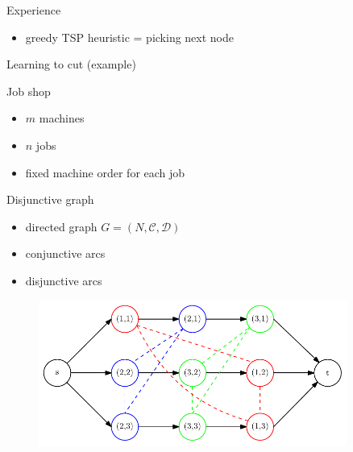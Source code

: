 \documentclass[bigger]{beamer}
\begin{document}
\begin{frame}[label={sec:org72eda48}]{Experience}
\begin{itemize}
\item greedy TSP heuristic = picking next node
\end{itemize}
\end{frame}

\begin{frame}[label={sec:orgf0b6253}]{Learning to cut (example)}
\end{frame}


\begin{frame}[label={sec:orge8a68b8}]{Job shop}
\begin{itemize}
\item \(m\) machines
\item \(n\) jobs
\item fixed machine order for each job
\end{itemize}
\end{frame}

\begin{frame}[label={sec:orgbe6a583}]{Disjunctive graph}
\begin{itemize}
\item directed graph \(G=(N, \mathcal{C}, \mathcal{D})\)
\item conjunctive arcs
\item disjunctive arcs
\end{itemize}

\begin{figure}
  \centering
  \includegraphics[width=0.9\textwidth]{disjunctive-graph.pdf}
\end{figure}
\end{frame}
\end{document}
